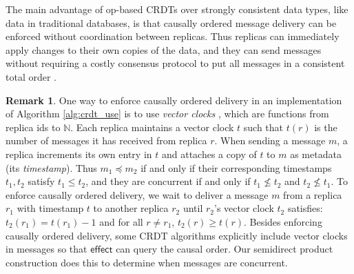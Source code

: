\documentclass[acmsmall,nonacm]{acmart}
\newcommand{\mb}[1]{\ensuremath{\mathbb{#1}}}
\newcommand{\msf}[1]{\ensuremath{\mathsf{#1}}}
\newcommand{\N}{\mb{N}}
\theoremstyle{plain}
\theoremstyle{definition}
\newtheorem{myrmk}[mythm]{Remark}
\begin{document}
The main advantage of op-based CRDTs over strongly consistent data types, like data in traditional databases, is that causally ordered message delivery can be enforced without coordination between replicas.  Thus replicas can immediately apply changes to their own copies of the data, and they can send messages without requiring a costly consensus protocol to put all messages in a consistent total order \cite{total_order_survey}.

\begin{myrmk}
One way to enforce causally ordered delivery in an implementation of Algorithm \ref{alg:crdt_use} is to use \textit{vector clocks} \cite{fidge, mattern}, which are functions from replica ids to $\N$.  Each replica maintains a vector clock $t$ such that $t(r)$ is the number of messages it has received from replica $r$.  When sending a message $m$, a replica increments its own entry in $t$ and attaches a copy of $t$ to $m$ as metadata (its \textit{timestamp}).  Thus $m_1 \preceq m_2$ if and only if their corresponding timestamps $t_1, t_2$ satisfy $t_1 \leq t_2$, and they are concurrent if and only if $t_1 \nleq t_2$ and $t_2 \nleq t_1$.  To enforce causally ordered delivery, we wait to deliver a message $m$ from a replica $r_1$ with timestamp $t$ to another replica $r_2$ until $r_2$'s vector clock $t_2$ satisfies: $t_2(r_1) = t(r_1) - 1$ and for all $r \neq r_1$, $t_2(r) \ge t(r)$.  Besides enforcing causally ordered delivery, some CRDT algorithms explicitly include vector clocks in messages so that $\msf{effect}$ can query the causal order.  Our semidirect product construction does this to determine when messages are concurrent.
\end{myrmk}


\end{document}
